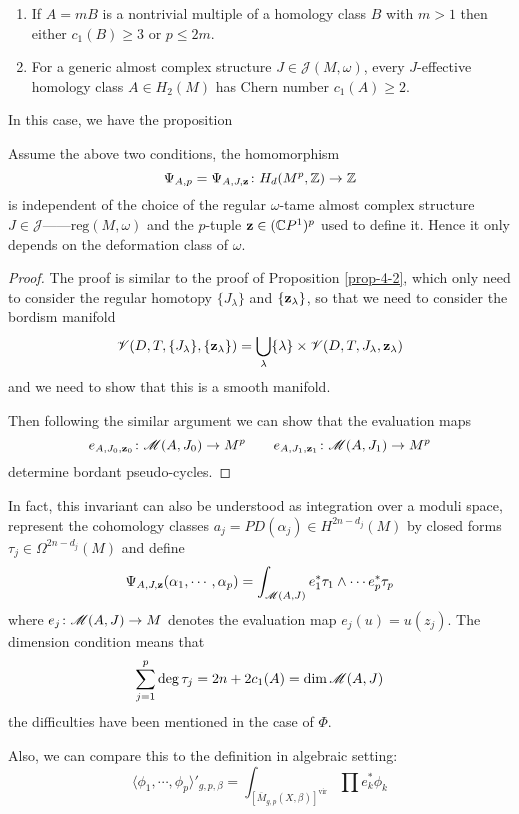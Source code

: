 \documentclass[twoside]{article}
\begin{document}
\begin{enumerate}
    \item If $A=mB$ is a nontrivial multiple of a homology class $B$ 
    with $m>1$ then either $c_1(B)\geq 3$ or $p\leq 2m$.
    \item For a generic almost complex structure $J\in\mathscr{J}(M,\omega)$, 
    every $J$-effective homology class $A\in H_2(M)$ has Chern number $c_1(A)\geq 2$.
\end{enumerate}

In this case, we have the proposition

\begin{proposition}
    Assume the above two conditions, the homomorphism
    \[\Psi_{A,p}=\Psi_{A,J,\mathbf{z}}\colon H_d(M^p,\mathbb{Z})\rightarrow \mathbb{Z}\]
    is independent of the choice of the regular $\omega$-tame almost complex structure 
    $J\in \mathscr{J}——{\textrm{reg}}(M,\omega)$ and the $p$-tuple $\mathbf{z}\in (\mathbb{C}P^{1})^p$ used to define it. 
    Hence it only depends on the deformation class of $\omega$.
\end{proposition}

\begin{proof}
    The proof is similar to the proof of Proposition \ref{prop-4-2}, 
    which only need to consider the regular homotopy $\{J_\lambda\}$ and $\{\mathbf{z}_\lambda\}$, 
    so that we need to consider the bordism manifold
    \[\mathscr{V}(D,T,\{J_\lambda\},\{\mathbf{z}_\lambda\})=\bigcup_{\lambda}\{\lambda\}\times\mathscr{V}(D,T,J_\lambda,\mathbf{z}_\lambda)\]
    and we need to show that this is a smooth manifold.
    
    Then following the similar argument we can show that the evaluation maps
    \[e_{A,J_0,\mathbf{z}_0}\colon \mathscr{M}(A,J_0)\rightarrow M^p \qquad e_{A,J_1,\mathbf{z}_1}\colon \mathscr{M}(A,J_1)\rightarrow M^p\]
    determine bordant pseudo-cycles.
\end{proof}

In fact, this invariant can also be understood as integration over a moduli space, 
represent the cohomology classes $a_j=PD(\alpha_j)\in H^{2n-d_j}(M)$ 
by closed forms $\tau_j\in \Omega^{2n-d_j}(M)$ and define
\[\Psi_{A,J,\mathbf{z}}(\alpha_1,\cdots,\alpha_p)=\int_{\mathscr{M}(A,J)}e_1^*\tau_1\wedge\cdots e_p^*\tau_p\]
where $e_j\colon \mathscr{M}(A,J)\rightarrow M$ denotes the evaluation map $e_j(u)=u(z_j)$. 
The dimension condition means that
\[\sum_{j=1}^p\deg \tau_j=2n+2c_1(A)=\dim\mathscr{M}(A,J)\]
the difficulties have been mentioned in the case of $\Phi$.

Also, we can compare this to the definition in algebraic setting:
\[\langle \phi_1,\cdots,\phi_p \rangle'_{g,p,\beta}=\int_{\left[\overline{M}_{g,p}(X,\beta)\right]^{\textrm{vir}}} \prod e_k^*\phi_k\]
\end{document}
